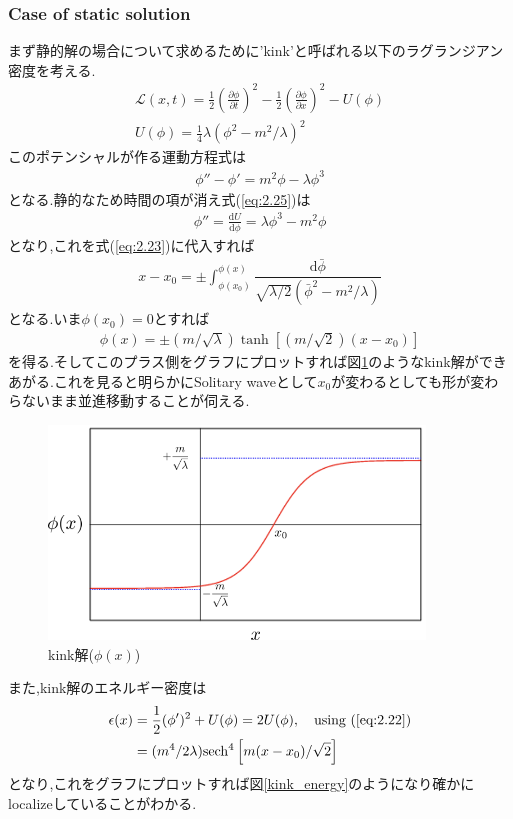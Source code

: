 \documentclass[dvipdfmx,11pt,a4paper]{jsbook}
\begin{document}
\subsubsection{Case of static solution}
まず静的解の場合について求めるために'kink'と呼ばれる以下のラグランジアン密度を考える.
\begin{align}
    \mathscr{L}(x, t)=\frac{1}{2}\left(\frac{\partial \phi}{\partial t}\right)^{2}-\frac{1}{2}\left(\frac{\partial \phi}{\partial x}\right)^{2}-U(\phi)\nonumber \\
    U(\phi)=\frac{1}{4}\lambda(\phi^2-m^2/\lambda)^2\label{eq:2.24}
\end{align}
このポテンシャルが作る運動方程式は
\begin{align}
    \phi''-\phi'=m^2\phi-\lambda\phi^3\label{eq:2.25}
\end{align}
となる.静的なため時間の項が消え式(\ref{eq:2.25})は
\begin{align}
    \phi''=\frac{\mathrm{d}U}{\mathrm{d}\phi}=\lambda\phi^3-m^2\phi
\end{align}
となり,これを式(\ref{eq:2.23})に代入すれば
\begin{align}
    x-x_{0}=\pm \int_{\phi(x_0)}^{\phi(x)}\dfrac{\mathrm{d}\bar{\phi}}{\sqrt{\lambda/2}(\bar{\phi}^2-m^2/\lambda)}
\end{align}
となる.いま$\phi(x_0)=0$とすれば
\begin{align}
    \phi(x)=\pm(m/\sqrt{\lambda})\tanh\left[(m/\sqrt{2})(x-x_0)\right]\label{eq:2.28}
\end{align}
を得る.そしてこのプラス側をグラフにプロットすれば図\ref{kink_phi}のようなkink解ができあがる.これを見ると明らかにSolitary waveとして$x_0$が変わるとしても形が変わらないまま並進移動することが伺える.
\begin{figure}[H]
    \centering
    \includegraphics[width=10cm]{figure/kink_phi.png}
    \caption{kink解($\phi(x)$)}
    \label{kink_phi}
\end{figure}
また,kink解のエネルギー密度は
\begin{align}
    \epsilon(x) & =\frac{1}{2}(\phi')^2+U(\phi)=2U(\phi),\quad \text{using (\ref{eq:2.22})} \\
                & =(m^4/2\lambda)\mathrm{sech^4}\left[m(x-x_0)/\sqrt{2}\right]
\end{align}
となり,これをグラフにプロットすれば図\ref{kink_energy}のようになり確かにlocalizeしていることがわかる.
\end{document}
